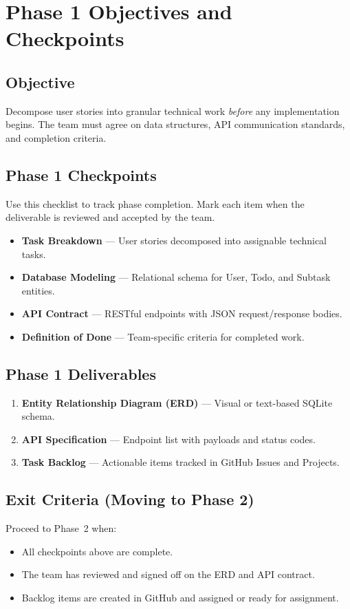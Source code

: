 \documentclass{article}
\begin{document}
\newpage
\section{Phase 1 Objectives and Checkpoints}\label{sec:phase1}

\subsection{Objective}
Decompose user stories into granular technical work \emph{before} any implementation begins.
The team must agree on data structures, API communication standards, and completion criteria.

\subsection{Phase 1 Checkpoints}
Use this checklist to track phase completion. Mark each item when the deliverable is reviewed
and accepted by the team.

\begin{itemize}
  \item[$\square$] \textbf{Task Breakdown} — User stories decomposed into assignable technical tasks.
  \item[$\square$] \textbf{Database Modeling} — Relational schema for User, Todo, and Subtask entities.
  \item[$\square$] \textbf{API Contract} — RESTful endpoints with JSON request/response bodies.
  \item[$\square$] \textbf{Definition of Done} — Team-specific criteria for completed work.
\end{itemize}

\subsection{Phase 1 Deliverables}
\begin{enumerate}
  \item \textbf{Entity Relationship Diagram (ERD)} — Visual or text-based SQLite schema.
  \item \textbf{API Specification} — Endpoint list with payloads and status codes.
  \item \textbf{Task Backlog} — Actionable items tracked in GitHub Issues and Projects.
\end{enumerate}

\subsection{Exit Criteria (Moving to Phase 2)}
Proceed to Phase~2 when:
\begin{itemize}
  \item All checkpoints above are complete.
  \item The team has reviewed and signed off on the ERD and API contract.
  \item Backlog items are created in GitHub and assigned or ready for assignment.
\end{itemize}
\end{document}
